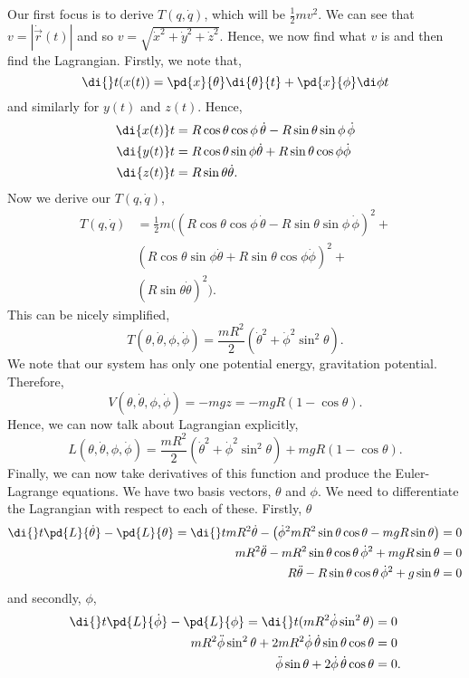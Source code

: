 Our first focus is to derive $T(q, \dot q)$, which will be $\frac{1}{2}mv^2$. We can see that $v = |\dot{\vec{r}}(t)|$ and so $v = \sqrt{\dot x^2 + \dot y^2 + \dot z^2}$. Hence, we now find what $v$ is and then find the Lagrangian. Firstly, we note that,
$$ \di {} t (x(t)) = \pd{x}{\theta}\di {\theta}{t} + \pd{x}{\phi}\di \phi t $$
and similarly for $y(t)$ and $z(t)$. Hence,
\begin{align*}
  \di {x(t)} t &= R\cos \theta \cos \phi \,\dot \theta - R\sin \theta \sin \phi \,\dot \phi\\
  \di {y(t)} t &= R\cos \theta\sin\phi \dot \theta + R\sin \theta\cos \phi \dot \phi\\
  \di {z(t)} t &= R\sin \theta\dot \theta.
\end{align*}
Now we derive our $T(q, \dot q)$,
\begin{align*}
  T(q, \dot q) &= \frac{1}{2}m \bigg( \left(R\cos \theta \cos \phi \,\dot \theta - R\sin \theta \sin \phi \,\dot \phi\right)^2 + \\
  & \left(R \cos \theta\sin\phi \dot \theta + R\sin \theta\cos \phi \dot \phi \right)^2 + \\
  & \left( R\sin \theta\dot \theta \right)^2 \bigg).
\end{align*}
This can be nicely simplified,
$$ T(\theta, \dot \theta, \phi, \dot \phi) = \frac{mR^2}{2}\left( \dot \theta^2 + \dot \phi ^2\sin^2 \theta \right). $$
We note that our system has only one potential energy, gravitation potential. Therefore,
$$ V(\theta, \dot \theta, \phi, \dot \phi) = -mgz = -mgR(1 - \cos \theta). $$
Hence, we can now talk about Lagrangian explicitly,
$$ L(\theta, \dot \theta, \phi, \dot \phi) = \frac{mR^2}{2} \left( \dot \theta^2 + \dot\phi^2\sin^2 \theta\right) + mgR\left(1 - \cos \theta\right). $$
Finally, we can now take derivatives of this function and produce the Euler-Lagrange equations. We have two basis vectors, $\theta$ and $\phi$. We need to differentiate the Lagrangian with respect to each of these. Firstly, $\theta$
\begin{align*}
  \di {} t \pd{L}{\dot\theta} - \pd{L}{\theta} = \di {} t {mR^2 \dot \theta} - \left( \dot\phi^2mR^2\sin\theta\cos\theta - mgR\sin\theta \right) &= 0\\
  mR^2\ddot{\theta} - mR^2\sin \theta \cos \theta\,\dot \phi^2 + mgR\sin \theta &= 0\\
  R\ddot{\theta} - R\sin \theta \cos \theta\,\dot \phi^2 + g\sin \theta &= 0
\end{align*}
and secondly, $\phi$,
\begin{align*}
  \di {} t \pd{L}{\dot\phi} - \pd{L}{\phi} = \di {} t  (mR^2 \dot \phi \sin^2 \theta) &= 0\\
  mR^2\ddot\phi\sin^2 \theta + 2mR^2\dot \phi\,\dot\theta \sin \theta\cos \theta &= 0\\
  \ddot\phi\sin \theta + 2\dot \phi\,\dot\theta\cos \theta &= 0.
\end{align*}
